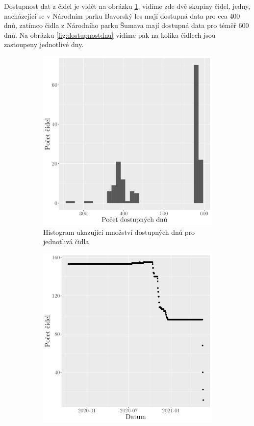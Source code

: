 Dostupnost dat z čidel je vidět na obrázku \ref{fig:dostupnostdat}, vidíme zde dvě skupiny čidel, jedny, nacházející se v Národním parku Bavorský les mají dostupná data pro cca 400 dnů, zatímco čidla z Národního parku Šumava mají dostupná data pro téměř 600 dnů. Na obrázku \ref{fig:dostupnostdnu} vidíme pak na kolika čidlech jsou zastoupeny jednotlivé dny.

\begin{figure}
	\centering
	\begin{subfigure}{0.45\textwidth}
  \includegraphics[width=\textwidth]{img/hist_numofdayavailability.png}
	\caption{Histogram ukazující množství dostupných dnů pro jednotlivá čidla}
	\label{fig:dostupnostdat}
	\end{subfigure}
	\hfill
	\begin{subfigure}{0.45\textwidth}
  \includegraphics[width=\textwidth]{img/date_availability.png}

\end{subfigure}
\end{figure}
